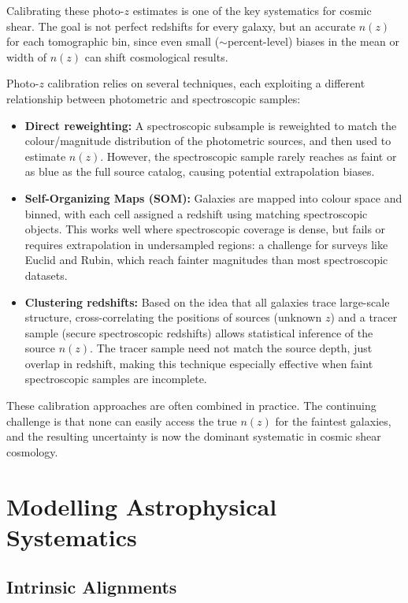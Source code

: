 Calibrating these photo-$z$ estimates is one of the key systematics for cosmic shear. The goal is not perfect redshifts for every galaxy, but an accurate $n(z)$ for each tomographic bin, since even small ($\sim$percent-level) biases in the mean or width of $n(z)$ can shift cosmological results.

Photo-$z$ calibration relies on several techniques, each exploiting a different relationship between photometric and spectroscopic samples:
\begin{itemize}
    \item \textbf{Direct reweighting:} A spectroscopic subsample is reweighted to match the colour/magnitude distribution of the photometric sources, and then used to estimate $n(z)$. However, the spectroscopic sample rarely reaches as faint or as blue as the full source catalog, causing potential extrapolation biases.
    
    \item \textbf{Self-Organizing Maps (SOM):} Galaxies are mapped into colour space and binned, with each cell assigned a redshift using matching spectroscopic objects. This works well where spectroscopic coverage is dense, but fails or requires extrapolation in undersampled regions: a challenge for surveys like Euclid and Rubin, which reach fainter magnitudes than most spectroscopic datasets.
    
    \item \textbf{Clustering redshifts:} Based on the idea that all galaxies trace large-scale structure, cross-correlating the positions of sources (unknown $z$) and a tracer sample (secure spectroscopic redshifts) allows statistical inference of the source $n(z)$. The tracer sample need not match the source depth, just overlap in redshift, making this technique especially effective when faint spectroscopic samples are incomplete.
\end{itemize}
These calibration approaches are often combined in practice. The continuing challenge is that none can easily access the true $n(z)$ for the faintest galaxies, and the resulting uncertainty is now the dominant systematic in cosmic shear cosmology. 

\section{Modelling Astrophysical Systematics} \label{sec:wl_modeling}

\subsection{Intrinsic Alignments} \label{subsec:wl_ia}


